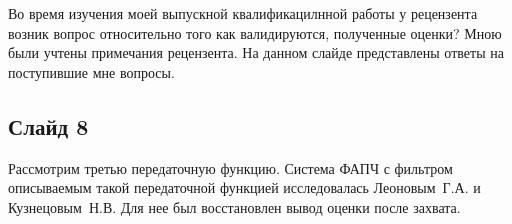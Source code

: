 \documentclass[a4paper,article,14pt]{extarticle}
\begin{document}
Во время изучения моей выпускной квалификацилнной работы у рецензента возник вопрос относительно того как валидируются, полученные оценки? Мною были учтены примечания рецензента. На данном слайде представлены ответы на поступившие мне вопросы.

\subsection*{Слайд 8}
Рассмотрим третью передаточную функцию. Система ФАПЧ с фильтром описываемым такой передаточной функцией исследовалась Леоновым~Г.\:А. и Кузнецовым~Н.\:В. Для нее был восстановлен вывод оценки после захвата.
\end{document}
